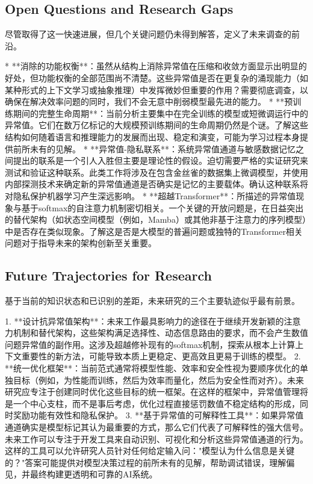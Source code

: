 \documentclass{article}
\begin{document}
\subsection{Open Questions and Research Gaps}

尽管取得了这一快速进展，但几个关键问题仍未得到解答，定义了未来调查的前沿。

* **消除的功能权衡**：虽然从结构上消除异常值在压缩和收敛方面显示出明显的好处，但功能权衡的全部范围尚不清楚。这些异常值是否在更复杂的涌现能力（如某种形式的上下文学习或抽象推理）中发挥微妙但重要的作用？需要彻底调查，以确保在解决效率问题的同时，我们不会无意中削弱模型最先进的能力。
* **预训练期间的完整生命周期**：当前分析主要集中在完全训练的模型或短微调运行中的异常值。它们在数万亿标记的大规模预训练期间的生命周期仍然是个谜。了解这些结构如何随着语言和推理能力的发展而出现、稳定和演变，可能为学习过程本身提供前所未有的见解。
* **异常值-隐私联系**：系统异常值通道与敏感数据记忆之间提出的联系是一个引人入胜但主要是理论性的假设。迫切需要严格的实证研究来测试和验证这种联系。此类工作将涉及在包含金丝雀的数据集上微调模型，并使用内部探测技术来确定新的异常值通道是否确实是记忆的主要载体。确认这种联系将对隐私保护机器学习产生深远影响。
* **超越Transformer**：所描述的异常值现象与基于softmax的自注意力机制密切相关。一个关键的开放问题是，在日益突出的替代架构（如状态空间模型（例如，Mamba）或其他非基于注意力的序列模型）中是否存在类似现象。了解这是否是大模型的普遍问题或独特的Transformer相关问题对于指导未来的架构创新至关重要。

\subsection{Future Trajectories for Research}

基于当前的知识状态和已识别的差距，未来研究的三个主要轨迹似乎最有前景。

1. **设计抗异常值架构**：未来工作最具影响力的途径在于继续开发新颖的注意力机制和替代架构，这些架构满足选择性、动态信息路由的要求，而不会产生数值问题异常值的副作用。这涉及超越修补现有的softmax机制，探索从根本上计算上下文重要性的新方法，可能导致本质上更稳定、更高效且更易于训练的模型。
2. **统一优化框架**：当前范式通常将模型性能、效率和安全性视为要顺序优化的单独目标（例如，为性能而训练，然后为效率而量化，然后为安全性而对齐）。未来研究应专注于创建同时优化这些目标的统一框架。在这样的框架中，异常值管理将是一个中心支柱，而不是事后考虑，优化过程直接惩罚数值不稳定结构的形成，同时奖励功能有效性和隐私保护。
3. **基于异常值的可解释性工具**：如果异常值通道确实是模型标记其认为最重要的方式，那么它们代表了可解释性的强大信号。未来工作可以专注于开发工具来自动识别、可视化和分析这些异常值通道的行为。这样的工具可以允许研究人员针对任何给定输入问："模型认为什么信息是关键的？"答案可能提供对模型决策过程的前所未有的见解，帮助调试错误，理解偏见，并最终构建更透明和可靠的AI系统。



\end{document}
